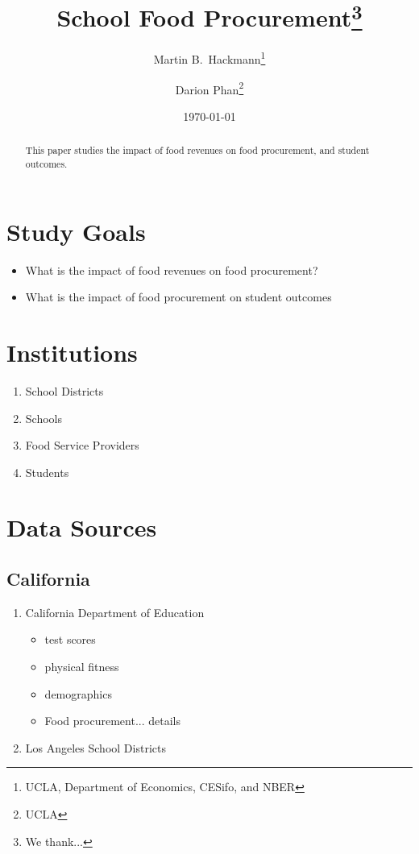 \documentclass[12pt]{article}
\begin{document}
\title{School Food Procurement\thanks{We thank...}}
\author{Martin B.\ Hackmann\thanks{UCLA, Department of Economics, CESifo, and NBER} \and Darion Phan\thanks{UCLA} }
\date{\today}

\maketitle

\begin{abstract} This paper studies the impact of food revenues on food procurement, and student outcomes.
	\end{abstract}

\section{Study Goals}

\begin{itemize}
	\item What is the impact of food revenues on food procurement?
	\item What is the impact of food procurement on student outcomes
\end{itemize}

\section{Institutions}
\begin{enumerate}
	\item School Districts
	\item Schools
	\item Food Service Providers
	\item Students
\end{enumerate} 

\section{Data Sources}

\subsection{California}

\begin{enumerate}
	\item California Department of Education
	\begin{itemize}
		\item test scores
		\item physical fitness
		\item demographics
		\item Food procurement... details
	\end{itemize}
	\item Los Angeles School Districts
	\end{enumerate}
\end{document}
